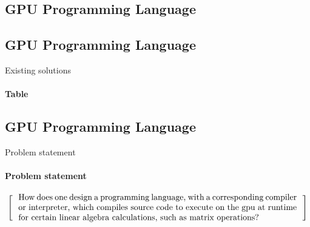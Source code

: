 \subsection{GPU Programming Language}

\subsection{GPU Programming Language}
\begin{frame}{Existing solutions}
\framesubtitle{Table }
\end{frame}

\subsection{GPU Programming Language}
\begin{frame}{Problem statement}
\framesubtitle{Problem statement}
\[
  \left[
  \begin{minipage}{\textwidth}
  \centering
  \begin{minipage}{0.96\textwidth}
  How does one design a programming language, with a corresponding compiler or interpreter, which compiles source code to execute on the gpu at runtime for certain linear algebra calculations, such as matrix operations?
  \end{minipage}
  \end{minipage}
    \right]
\]
\end{frame}